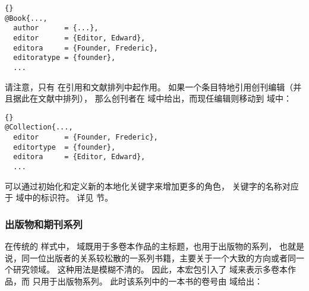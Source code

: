 \begin{lstlisting}[style=bibtex]{}
@Book{...,
  author      = {...},
  editor      = {Editor, Edward},
  editora     = {Founder, Frederic},
  editoratype = {founder},
  ...
\end{lstlisting}
%
请注意，只有  在引用和文献排列中起作用。
如果一个条目特地引用创刊编辑（并且据此在文献中排列），
那么创刊者在  域中给出，而现任编辑则移动到  域中：

\begin{lstlisting}[style=bibtex]{}
@Collection{...,
  editor      = {Founder, Frederic},
  editortype  = {founder},
  editora     = {Editor, Edward},
  ...
\end{lstlisting}
%
可以通过初始化和定义新的本地化关键字来增加更多的角色，
关键字的名称对应于  域中的标识符。
详见  节。

\subsubsection{出版物和期刊系列}%
\label{bib:use:ser}


在传统的 \BibTeX 样式中， 域既用于多卷本作品的主标题，也用于出版物的系列，
也就是说，同一位出版者的关系较松散的一系列书籍，主要关于一个大致的方向或者同一个研究领域。
这种用法是模糊不清的。
因此，本宏包引入了  域来表示多卷本作品，而  只用于出版物系列。
此时该系列中的一本书的卷号由  域给出：

